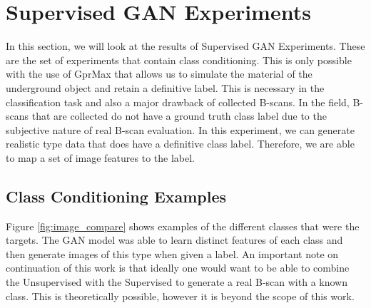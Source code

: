 \section{Supervised GAN Experiments}\label{Supervised}
In this section, we will look at the results of Supervised GAN Experiments. These are the set of experiments that contain class conditioning. This is only possible with the use of GprMax that allows us to simulate the material of the underground object and retain a definitive label. This is necessary in the classification task and also a major drawback of collected B-scans. In the field, B-scans that are collected do not have a ground truth class label due to the subjective nature of real B-scan evaluation. In this experiment, we can generate realistic type data that does have a definitive class label. Therefore, we are able to map a set of image features to the label. 

\subsection{Class Conditioning Examples}
Figure \ref{fig:image_compare} shows examples of the different classes that were the targets. The GAN model was able to learn distinct features of each class and then generate images of this type when given a label. An important note on continuation of this work is that ideally one would want to be able to combine the Unsupervised with the Supervised to generate a real B-scan with a known class. This is theoretically possible, however it is beyond the scope of this work. 

